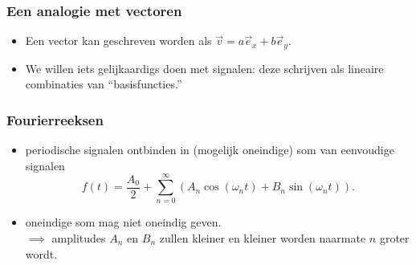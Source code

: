 \documentclass[compress, darktitle, framenumber]{beamer}
\newcommand{\brac}[1]{\left( #1 \right)} %
\begin{document}
\begin{frame}[fragile]
\frametitle{Een analogie met vectoren}
\begin{itemize}
\item Een vector kan geschreven worden als $\vec{v}=a\vec{e}_x+b\vec{e}_y.$
\end{itemize}
\begin{itemize}
\item We willen iets gelijkaardigs doen met signalen: deze schrijven als lineaire combinaties van ``basisfuncties.''
\end{itemize}
\end{frame}

\begin{frame}
\frametitle{Fourierreeksen}
\begin{itemize}
\item periodische signalen ontbinden in (mogelijk oneindige) som van eenvoudige signalen 
$$f(t)=\frac{A_0}{2}+\sum_{n=0}^{\infty}\brac{A_n \cos(\omega_n t)+B_n\sin(\omega_n t)}. $$
\item oneindige som mag niet oneindig geven. \\ \noindent 
$\implies$ amplitudes $A_n$ en $B_n$ zullen kleiner en kleiner worden naarmate $n$ groter wordt. 
\end{itemize}
\end{frame}
\end{document}
